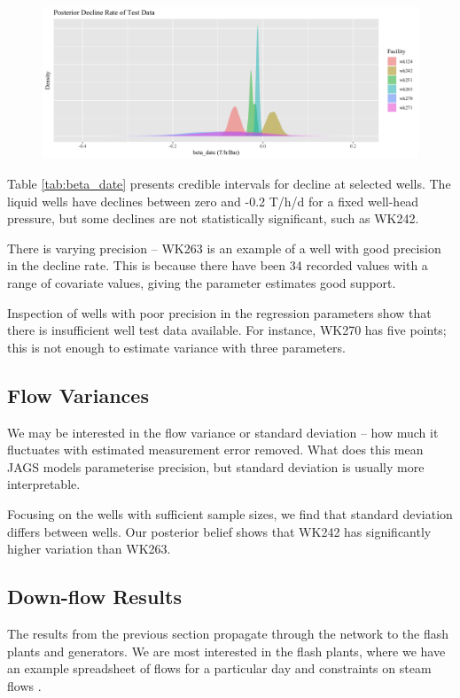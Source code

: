 \documentclass[a4paper, 12pt]{article}
\begin{document}
\begin{figure}
  \centering
  \includegraphics[width=\linewidth]{media/beta_date}
  \label{fig:beta_date}
\end{figure}



Table \ref{tab:beta_date} presents credible intervals for decline at selected wells. The liquid wells have declines between zero and -0.2 T/h/d for a fixed well-head pressure, but some declines are not statistically significant, such as WK242.

There is varying precision -- WK263 is an example of a well with good precision in the decline rate. This is because there have been 34 recorded values with a range of covariate values, giving the parameter estimates good support.

Inspection of wells with poor precision in the regression parameters show that there is insufficient well test data available. For instance, WK270 has five points; this is not enough to estimate variance with three parameters.

\subsection{Flow Variances}
We may be interested in the flow variance or standard deviation -- how much it fluctuates with estimated measurement error removed. What does this mean JAGS models parameterise precision, but standard deviation  is usually more interpretable.

Focusing on the wells with sufficient sample sizes, we find that standard deviation differs between wells. Our posterior belief shows that WK242 has significantly higher variation than WK263.

\subsection{Down-flow Results}
The results from the previous section propagate through the network to the flash plants and generators. We are most interested in the flash plants, where we have an example spreadsheet of flows for a particular day and constraints on steam flows .
\end{document}
